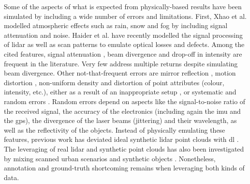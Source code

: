 Some of the aspects of what is expected from physically-based results have been simulated by including a wide number of errors and limitations. First, Xhao et al. \cite{zhao_method_2021} modelled atmospheric effects such as rain, snow and fog by including signal attenuation and noise. Haider et al. \cite{haider_development_2022} have recently modelled the signal processing of \acrshort{lidar} as well as scan patterns to emulate optical losses and defects. Among the cited features, signal attenuation \cite{dosovitskiy_carla_2017, bechtold_helios_2016, hanke_generation_2017}, beam divergence \cite{zhao_method_2021, bechtold_helios_2016, hanke_generation_2017, haider_development_2022} and drop-off in intensity \cite{ahn_real-time_2020} are frequent in the literature. Very few address multiple returns \cite{winiwarter_virtual_2022} despite simulating beam divergence. Other not-that-frequent errors are mirror reflection \cite{ullrich_advances_2019}, motion distortion \cite{chen_analysis_2022}, non-uniform density and distortion of point attributes (colour, intensity, etc.), either as a result of an inappropriate setup \cite{dimitrov_segmentation_2015}, or systematic and random errors \cite{isheil_systematic_2011, fan_error_2015, pandzic_error_2017}. Random errors depend on aspects like the signal-to-noise ratio of the received signal, the accuracy of the electronics (including again the \acrshort{imu} and the \acrshort{gps}), the divergence of the laser beams (jittering) and their wavelength, as well as the reflectivity of the objects. Instead of physically emulating these features, previous work has deviated ideal synthetic \acrshort{lidar} point clouds with \acrshort{dl} \cite{manivasagam_lidarsim_2020, xiao_synlidar_2021, guillard_learning_2022}. The leveraging of real \acrshort{lidar} and synthetic point clouds has also been investigated by mixing scanned urban scenarios and synthetic objects \cite{manivasagam_lidarsim_2020}. Nonetheless, annotation and ground-truth shortcoming remains when leveraging both kinds of data.

